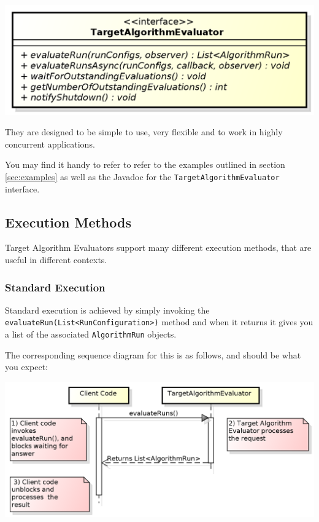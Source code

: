 \documentclass[11pt,letterpaper,oneside]{article}
\begin{document}
\begin{center}
\includegraphics[scale=0.75]{img/UML/TAEBasic.png}
\end{center}
They are designed to be simple to use, very flexible and to work in highly concurrent applications.

You may find it handy to refer to refer to the examples outlined in section \ref{sec:examples} as well as the Javadoc for the \texttt{TargetAlgorithmEvaluator} interface.

\subsection{Execution Methods}

Target Algorithm Evaluators support many different execution methods, that are useful in different contexts.

\subsubsection{Standard Execution}

Standard execution is achieved by simply invoking the \texttt{evaluateRun(List<RunConfiguration>)} method and when it returns it gives you a list of the associated \texttt{AlgorithmRun} objects.

The corresponding sequence diagram for this is as follows, and should be what you expect:

\begin{center}
\includegraphics[scale=0.75]{img/UML/TAESequence1.png}
\end{center}
\end{document}
